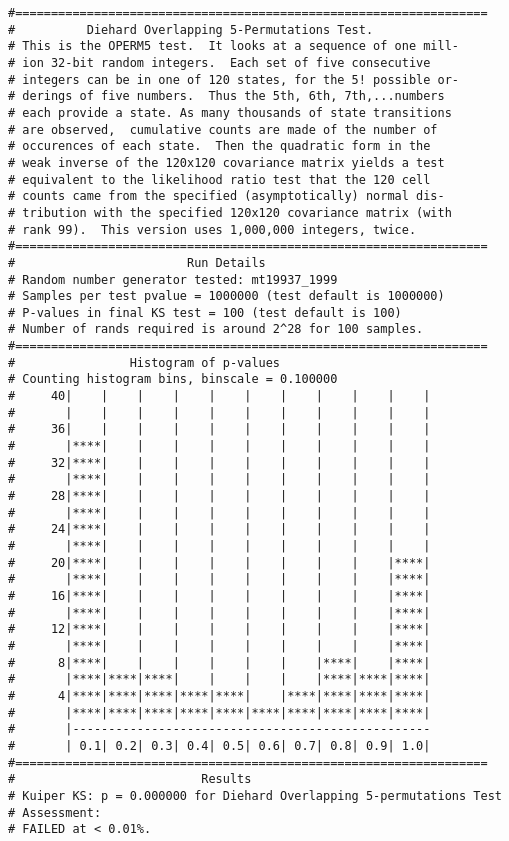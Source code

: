 \documentclass[12pt]{article}
\begin{document}
\begin{verbatim}
#==================================================================
#          Diehard Overlapping 5-Permutations Test.
# This is the OPERM5 test.  It looks at a sequence of one mill- 
# ion 32-bit random integers.  Each set of five consecutive     
# integers can be in one of 120 states, for the 5! possible or- 
# derings of five numbers.  Thus the 5th, 6th, 7th,...numbers   
# each provide a state. As many thousands of state transitions  
# are observed,  cumulative counts are made of the number of    
# occurences of each state.  Then the quadratic form in the     
# weak inverse of the 120x120 covariance matrix yields a test   
# equivalent to the likelihood ratio test that the 120 cell     
# counts came from the specified (asymptotically) normal dis-   
# tribution with the specified 120x120 covariance matrix (with  
# rank 99).  This version uses 1,000,000 integers, twice.       
#==================================================================
#                        Run Details
# Random number generator tested: mt19937_1999
# Samples per test pvalue = 1000000 (test default is 1000000)
# P-values in final KS test = 100 (test default is 100)
# Number of rands required is around 2^28 for 100 samples.
#==================================================================
#                Histogram of p-values
# Counting histogram bins, binscale = 0.100000
#     40|    |    |    |    |    |    |    |    |    |    |
#       |    |    |    |    |    |    |    |    |    |    |
#     36|    |    |    |    |    |    |    |    |    |    |
#       |****|    |    |    |    |    |    |    |    |    |
#     32|****|    |    |    |    |    |    |    |    |    |
#       |****|    |    |    |    |    |    |    |    |    |
#     28|****|    |    |    |    |    |    |    |    |    |
#       |****|    |    |    |    |    |    |    |    |    |
#     24|****|    |    |    |    |    |    |    |    |    |
#       |****|    |    |    |    |    |    |    |    |    |
#     20|****|    |    |    |    |    |    |    |    |****|
#       |****|    |    |    |    |    |    |    |    |****|
#     16|****|    |    |    |    |    |    |    |    |****|
#       |****|    |    |    |    |    |    |    |    |****|
#     12|****|    |    |    |    |    |    |    |    |****|
#       |****|    |    |    |    |    |    |    |    |****|
#      8|****|    |    |    |    |    |    |****|    |****|
#       |****|****|****|    |    |    |    |****|****|****|
#      4|****|****|****|****|****|    |****|****|****|****|
#       |****|****|****|****|****|****|****|****|****|****|
#       |--------------------------------------------------
#       | 0.1| 0.2| 0.3| 0.4| 0.5| 0.6| 0.7| 0.8| 0.9| 1.0|
#==================================================================
#                          Results
# Kuiper KS: p = 0.000000 for Diehard Overlapping 5-permutations Test
# Assessment:
# FAILED at < 0.01%.


\end{verbatim}
\end{document}
